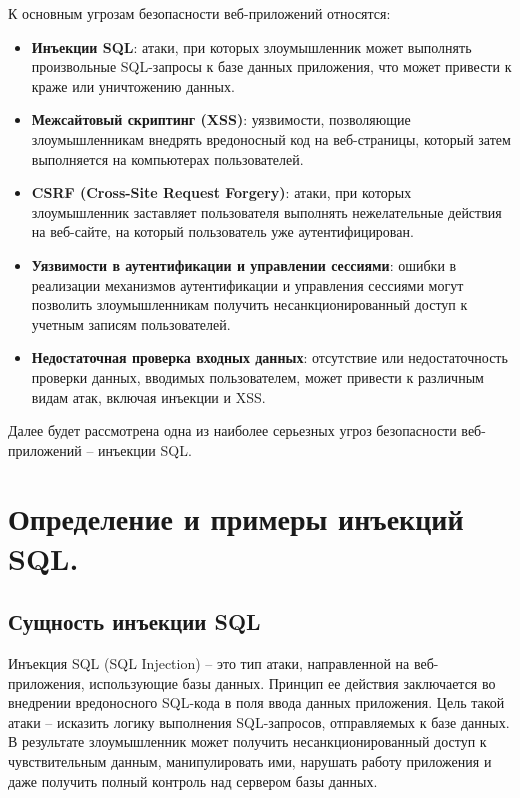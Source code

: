 \documentclass[a4paper,12pt]{diplom}
\begin{document}
	К основным угрозам безопасности веб-приложений относятся:
	
	\begin{itemize}
		\item \textbf{Инъекции SQL}: атаки, при которых злоумышленник может выполнять произвольные SQL-запросы к базе данных приложения, что может привести к краже или уничтожению данных.
		\item \textbf{Межсайтовый скриптинг (XSS)}: уязвимости, позволяющие злоумышленникам внедрять вредоносный код на веб-страницы, который затем выполняется на компьютерах пользователей.
		\item \textbf{CSRF (Cross-Site Request Forgery)}: атаки, при которых злоумышленник заставляет пользователя выполнять нежелательные действия на веб-сайте, на который пользователь уже аутентифицирован.
		\item \textbf{Уязвимости в аутентификации и управлении сессиями}: ошибки в реализации механизмов аутентификации и управления сессиями могут позволить злоумышленникам получить несанкционированный доступ к учетным записям пользователей.
		\item \textbf{Недостаточная проверка входных данных}: отсутствие или недостаточность проверки данных, вводимых пользователем, может привести к различным видам атак, включая инъекции и XSS.
	\end{itemize}
	
	Далее будет рассмотрена одна из наиболее серьезных угроз безопасности веб-приложений – инъекции SQL.
	
	
	\section {Определение и примеры инъекций SQL.}
	
	
	\subsection{Сущность инъекции SQL}
	
	Инъекция SQL (SQL Injection) – это тип атаки, направленной на веб-приложения, использующие базы данных. Принцип ее действия заключается во внедрении вредоносного SQL-кода в поля ввода данных приложения. Цель такой атаки – исказить логику выполнения SQL-запросов, отправляемых к базе данных. В результате злоумышленник может получить несанкционированный доступ к чувствительным данным, манипулировать ими, нарушать работу приложения и даже получить полный контроль над сервером базы данных.
	
\end{document}
